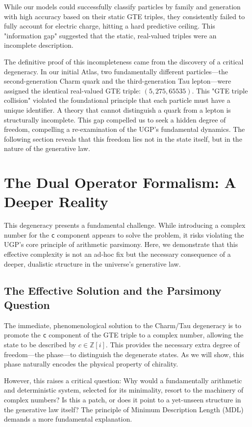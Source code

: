\documentclass[11pt]{article}
\theoremstyle{remark}
\begin{document}
While our models could successfully classify particles by family and generation with high accuracy based on their static GTE triples, they consistently failed to fully account for electric charge, hitting a hard predictive ceiling. This "information gap" suggested that the static, real-valued triples were an incomplete description.

The definitive proof of this incompleteness came from the discovery of a critical degeneracy. In our initial Atlas, two fundamentally different particles—the second-generation Charm quark and the third-generation Tau lepton—were assigned the identical real-valued GTE triple: $(5, 275, 65535)$. This "GTE triple collision" violated the foundational principle that each particle must have a unique identifier. A theory that cannot distinguish a quark from a lepton is structurally incomplete. This gap compelled us to seek a hidden degree of freedom, compelling a re-examination of the UGP's fundamental dynamics. The following section reveals that this freedom lies not in the state itself, but in the nature of the generative law.

\section{The Dual Operator Formalism: A Deeper Reality}
\label{sec:dual_operator}

This degeneracy presents a fundamental challenge. While introducing a complex number for the \texttt{c} component appears to solve the problem, it risks violating the UGP's core principle of arithmetic parsimony. Here, we demonstrate that this effective complexity is not an ad-hoc fix but the necessary consequence of a deeper, dualistic structure in the universe's generative law.

\subsection{The Effective Solution and the Parsimony Question}
The immediate, phenomenological solution to the Charm/Tau degeneracy is to promote the \texttt{c} component of the GTE triple to a complex number, allowing the state to be described by $c \in \mathbb{Z}[i]$. This provides the necessary extra degree of freedom---the phase---to distinguish the degenerate states. As we will show, this phase naturally encodes the physical property of chirality.

However, this raises a critical question: Why would a fundamentally arithmetic and deterministic system, selected for its minimality, resort to the machinery of complex numbers? Is this a patch, or does it point to a yet-unseen structure in the generative law itself? The principle of Minimum Description Length (MDL) demands a more fundamental explanation.
\end{document}

